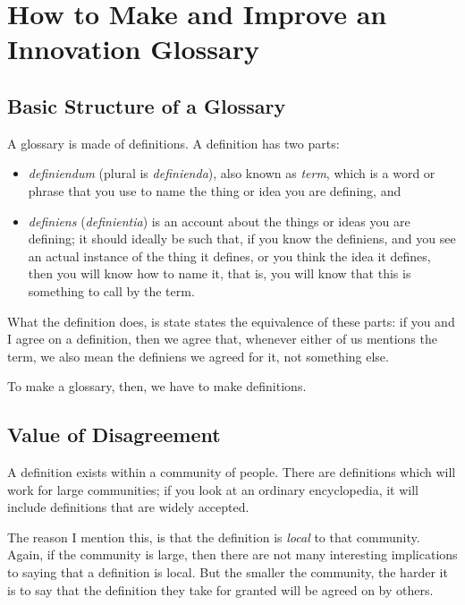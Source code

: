 \chapter{How to Make and Improve an Innovation Glossary}
\label{c:practical_guide}


\section{Basic Structure of a Glossary}
A glossary is made of definitions. A definition has two parts: 
\begin{itemize}
        \item \textit{definiendum} (plural is \textit{definienda}), also known as \textit{term}, which is a word or phrase that you use to name the thing or idea you are defining, and
        \item \textit{definiens} (\textit{definientia}) is an account about the things or ideas you are defining; it should ideally be such that, if you know the definiens, and you see an actual instance of the thing it defines, or you think the idea it defines, then you will know how to name it, that is, you will know that this is something to call by the term.
\end{itemize}

What the definition does, is state states the equivalence of these parts: if you and I agree on a definition, then we agree that, whenever either of us mentions the term, we also mean the definiens we agreed for it, not something else. 

To make a glossary, then, we have to make definitions.

\section{Value of Disagreement}
A definition exists within a community of people. There are definitions which will work for large communities; if you look at an ordinary encyclopedia, it will include definitions that are widely accepted.

The reason I mention this, is that the definition is \textit{local} to that community. Again, if the community is large, then there are not many interesting implications to saying that a definition is local. But the smaller the community, the harder it is to say that the definition they take for granted will be agreed on by others. 

